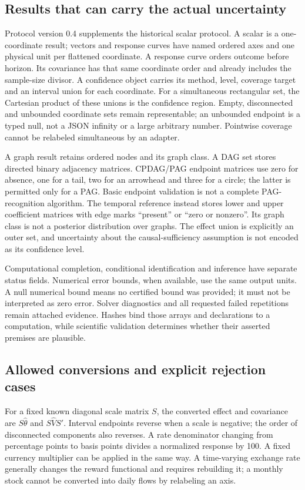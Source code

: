 \subsection{Results that can carry the actual uncertainty}
Protocol version 0.4 supplements the historical scalar protocol. A scalar
is a one-coordinate result; vectors and response curves have named ordered
axes and one physical unit per flattened coordinate. A response curve orders
outcome before horizon. Its covariance has that same coordinate order and
already includes the sample-size divisor. A confidence object carries its
method, level, coverage target and an interval union for each coordinate.
For a simultaneous rectangular set, the Cartesian product of these unions
is the confidence region. Empty, disconnected and unbounded coordinate sets
remain representable; an unbounded endpoint is a typed null, not a JSON
infinity or a large arbitrary number. Pointwise coverage cannot be relabeled
simultaneous by an adapter.

A graph result retains ordered nodes and its graph class. A DAG set stores
directed binary adjacency matrices. CPDAG/PAG endpoint matrices use zero
for absence, one for a tail, two for an arrowhead and three for a circle;
the latter is permitted only for a PAG. Basic endpoint validation is not
a complete PAG-recognition algorithm. The temporal reference instead stores
lower and upper coefficient matrices with edge marks ``present'' or
``zero or nonzero''. Its graph class is not a posterior distribution over
graphs. The effect union is explicitly an outer set, and uncertainty about
the causal-sufficiency assumption is not encoded as its confidence level.

Computational completion, conditional identification and inference have
separate status fields. Numerical error bounds, when available, use the
same output units. A null numerical bound means no certified bound was
provided; it must not be interpreted as zero error. Solver diagnostics and
all requested failed repetitions remain attached evidence. Hashes bind
those arrays and declarations to a computation, while scientific validation
determines whether their asserted premises are plausible.

\subsection{Allowed conversions and explicit rejection cases}
For a fixed known diagonal scale matrix $S$, the converted effect and
covariance are $S\widehat\theta$ and $S\widehat V S'$. Interval endpoints
reverse when a scale is negative; the order of disconnected components
also reverses. A rate denominator changing from percentage points to basis
points divides a normalized response by 100. A fixed currency multiplier
can be applied in the same way. A time-varying exchange rate generally
changes the reward functional and requires rebuilding it; a monthly stock
cannot be converted into daily flows by relabeling an axis.

